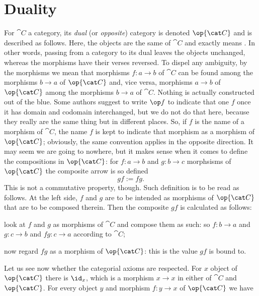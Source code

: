 
\section{Duality}

For \(\cat C\) a category, its {\em dual} (or {\em opposite}) category
is denoted \(\op{\cat C}\) and is described as follows. Here, the
objects are the same of \(\cat C\) and  exactly means . In other words, passing from a category to its dual
leaves the objects unchanged, whereas the morphisms have their verses
reversed. To dispel any ambiguity, by  the morphisms we
mean that morphisms \(f : a \to b\) of \(\cat C\) can be found among the
morphisms \(b \to a\) of \(\op{\cat C}\) and, vice versa, morphisms
\(a \to b\) of \(\op{\cat C}\) among the morphisms \(b \to a\) of
\(\cat C\). Nothing is actually constructed out of the blue. Some
authors suggest to write \(\op f\) to indicate that one \(f\) once it
has domain and codomain interchanged, but we do not do that here,
because they really are the same thing but in different places. So, if
\(f\) is the name of a morphism of \(\cat C\), the name \(f\) is kept
to indicate that morphism as a morphism of \(\op{\cat C}\); obviously,
the same convention applies in the opposite direction. It may seem we
are going to nowhere, but it makes sense when it comes to define the
compositions in \(\op{\cat C}\): for \(f : a \to b\) and
\(g : b \to c\) morphsisms of \(\op{\cat C}\) the composite arrow is so
defined
\[gf := fg .\label{defeqn:DualComp}\] This is not a commutative
property, though. Such definition is to be read as follows. At the
left side, \(f\) and \(g\) are to be intended as morphisms of
\(\op{\cat C}\) that are to be composed therein. Then the composite
\(gf\) is calculated as follows:
\begin{tcbenum}
\item look at \(f\) and \(g\) as morphisms of \(\cat C\) and compose
  them as such: so \(f : b \to a\) and \(g : c \to b\) and
  \(fg : c \to a\) according to \(\cat C\);
\item now regard \(fg\) as a morphism of \(\op{\cat C}\): this is the
  value \(gf\) is bound to.
\end{tcbenum}
Let us see now whether the categorial axioms are respected. For \(x\)
object of \(\op {\cat C}\) there is \(\id_x\), which is a morphism
\(x \to x\) in either of \(\cat C\) and \(\op{\cat C}\). For every
object \(y\) and morphism \(f : y \to x\) of \(\op{\cat C}\) we have
